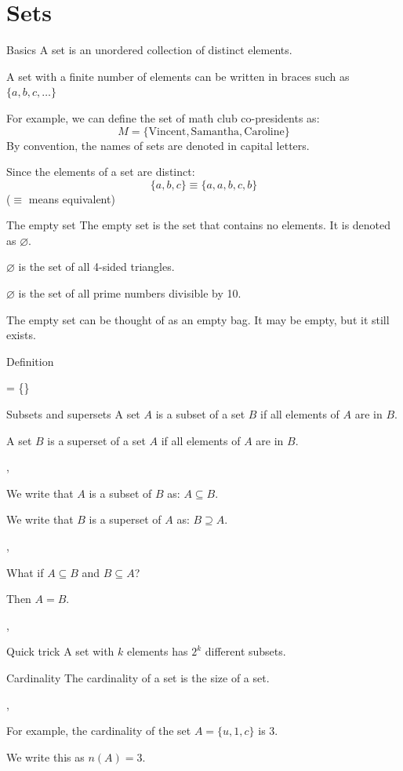 	\section{Sets}
	\begin{namedframe}{Basics}
		A set is an unordered collection of distinct elements.

		A set with a finite number of elements can be written in braces such as $\{a, b, c, \dots\}$

		For example, we can define the set of math club co-presidents as:
		\[M = \{\text{Vincent}, \text{Samantha}, \text{Caroline}\}\]
		By convention, the names of sets are denoted in capital letters.

		Since the elements of a set are distinct:
		\[\{a, b, c\} \equiv \{a, a, b, c, b\}\]
		($\equiv$ means equivalent)
	\end{namedframe}
	\begin{namedframe}{The empty set}
		The empty set is the set that contains no elements. It is denoted as $\varnothing$.
		
		\begin{examples}
			$\varnothing$ is the set of all 4-sided triangles.

			$\varnothing$ is the set of all prime numbers divisible by 10.
		\end{examples}
		The empty set can be thought of as an empty bag. It may be empty, but it still exists.
		\begin{block}{Definition}
			\begin{compactmath}[\Huge]
				\varnothing = \{\}
			\end{compactmath}
		\end{block}
	\end{namedframe}
	\begin{namedframe}{Subsets and supersets}
		A set $A$ is a subset of a set $B$ if all elements of $A$ are in $B$.

		A set $B$ is a superset of a set $A$ if all elements of $A$ are in $B$.

		\sep

		We write that $A$ is a subset of $B$ as: $A \subseteq B$.

		We write that $B$ is a superset of $A$ as: $B \supseteq A$.

		\sep

		What if $A \subseteq B$ and $B \subseteq A$?

		\pause

		Then $A = B$.

		\sep

		\begin{block}{Quick trick}
			A set with $k$ elements has $2^k$ different subsets.
		\end{block}
	\end{namedframe}
	\begin{namedframe}{Cardinality}
		The cardinality of a set is the size of a set.

		\sep

		For example, the cardinality of the set $A = \{u, 1, c\}$ is \pause$3$.

		We write this as $n(A) = 3$.
	\end{namedframe}
